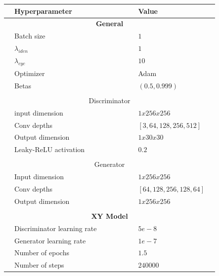 \documentclass[12pt, fleqn, titlepage]{article}
\newcommand{\1}[1]{\mathds{1}\left[#1\right]}
\begin{document}
\begin{table}[H]
	\centering
	\begin{tabular}{l l l l l l l l l}
		\toprule
		& \textbf{Hyperparameter}     &&&&& & \textbf{Value}   & \\ \midrule
		& \multicolumn{7}{c}{\textbf{General}}              & \\
		& Batch size                  &&&&& & $1$           & \\
		& $\lambda_{iden}$            &&&&& & $1$           & \\
		& $\lambda_{cyc}$             &&&&& & $10$          & \\
		& Optimizer                   &&&&& & Adam          & \\
		& Betas                       &&&&& & $(0.5, 0.999)$& \\
		&                             &&&&& &               & \\
		& \multicolumn{7}{c}{Discriminator}                 & \\
		& input dimension             &&&&& & $1x256x256$   & \\
		& Conv depths                 &&&&& & $\left[3, 64, 128, 256, 512\right]$& \\
		& Output dimension            &&&&& & $1x30x30$     & \\
		& Leaky-ReLU activation       &&&&& & $0.2$         & \\
		&                             &&&&& &               & \\
		& \multicolumn{7}{c}{Generator}                     & \\
		& Input dimension             &&&&& & $1x256x256$   & \\
		& Conv depths                 &&&&& & $\left[64, 128, 256, 128, 64\right]$              & \\
		& Output dimension            &&&&& & $1x256x256$   & \\
		&                             &&&&& &               & \\ 
		& \multicolumn{7}{c}{\textbf{XY Model}}             & \\
		& Discriminator learning rate &&&&& & $5e-8$        & \\
		& Generator learning rate     &&&&& & $1e-7$        & \\
		& Number of epochs            &&&&& & $1.5$         & \\
		& Number of steps             &&&&& & $240000$      & \\

\end{tabular}
\end{table}
\end{document}
